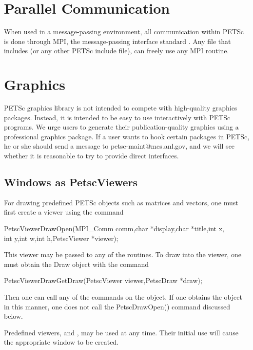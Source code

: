 {{{\section{Parallel Communication}

When used in a message-passing environment, all communication 
within
PETSc is done through MPI, the message-passing interface standard
\cite{MPI-final}.  Any file that includes  (or any other 
PETSc include file), can freely use any MPI routine.

\section{Graphics}

PETSc graphics library is not intended to compete with 
high-quality graphics packages.  Instead, it is intended to be 
easy to use interactively with PETSc programs. We urge users
to generate their publication-quality graphics using a
professional graphics package. If a user wants to hook
certain packages in PETSc, he or she should send a message to 
petsc-maint@mcs.anl.gov, and we will see whether it is reasonable
to try to provide direct interfaces.

\subsection{Windows as PetscViewers}
For drawing predefined PETSc objects such as matrices and vectors, one must 
first create a viewer using the 
command 
\begin{tabbing}
  PetscViewerDrawOpen(MPI\_Comm comm,char *display,char *title,int x,\\
                       int y,int w,int h,PetscViewer *viewer);
\end{tabbing}
This viewer may be passed to any of the  routines.
To draw into the viewer, one must obtain the Draw object with the
command 
\begin{tabbing}
  PetscViewerDrawGetDraw(PetscViewer viewer,PetscDraw *draw);
\end{tabbing}
Then one can call any of the  commands on the 
object. If one obtains the  object in this manner, 
one does not call the PetscDrawOpen() command discussed below.

  
Predefined viewers,  
and , may be used at any time. Their initial
use will cause the appropriate window to be created.

}}}
